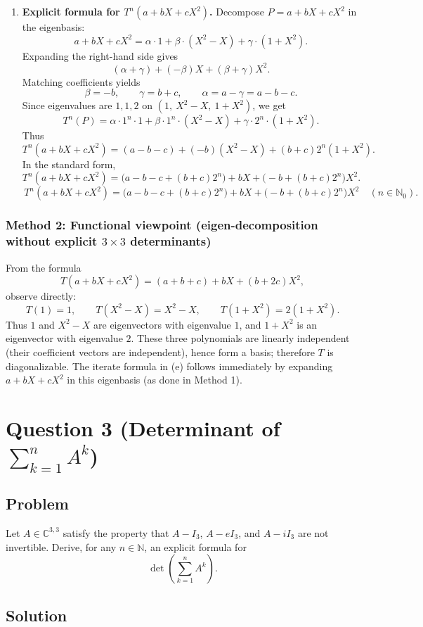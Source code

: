 \documentclass[12pt]{article}
\newcommand{\C}{\mathbb{C}}
\begin{document}
\begin{enumerate}[label=(\alph*)]
\item \textbf{Explicit formula for $T^n(a+bX+cX^2)$.}
Decompose $P=a+bX+cX^2$ in the eigenbasis:
\[
a+bX+cX^2 = \alpha\cdot 1 + \beta\cdot (X^2-X) + \gamma\cdot(1+X^2).
\]
Expanding the right-hand side gives
\[
(\alpha+\gamma) + (-\beta)X + (\beta+\gamma)X^2.
\]
Matching coefficients yields
\[
\beta=-b,\qquad \gamma=b+c,\qquad \alpha=a-\gamma=a-b-c.
\]
Since eigenvalues are $1,1,2$ on $(1,\ X^2-X,\ 1+X^2)$, we get
\[
T^n(P)=\alpha\cdot 1^n\cdot 1+\beta\cdot 1^n\cdot (X^2-X)+\gamma\cdot 2^n\cdot (1+X^2).
\]
Thus
\[
T^n(a+bX+cX^2)
=
(a-b-c) + (-b)(X^2-X) + (b+c)2^n(1+X^2).
\]
In the standard form,
\[
T^n(a+bX+cX^2)
=
\bigl(a-b-c+(b+c)2^n\bigr)
+bX
+\bigl(-b+(b+c)2^n\bigr)X^2.
\]
\[
\boxed{
\,
T^n(a+bX+cX^2)
=
\bigl(a-b-c+(b+c)2^n\bigr)
+bX
+\bigl(-b+(b+c)2^n\bigr)X^2
\quad(n\in\mathbb{N}_0).
\,}
\]
\end{enumerate}

\subsubsection{Method 2: Functional viewpoint (eigen-decomposition without explicit $3\times 3$ determinants)}
From the formula
\[
T(a+bX+cX^2)=(a+b+c)+bX+(b+2c)X^2,
\]
observe directly:
\[
T(1)=1,\qquad T(X^2-X)=X^2-X,\qquad T(1+X^2)=2(1+X^2).
\]
Thus $1$ and $X^2-X$ are eigenvectors with eigenvalue $1$, and $1+X^2$ is an eigenvector with eigenvalue $2$.
These three polynomials are linearly independent (their coefficient vectors are independent), hence form a basis; therefore $T$ is diagonalizable.
The iterate formula in (e) follows immediately by expanding $a+bX+cX^2$ in this eigenbasis (as done in Method 1).

\newpage
\section{Question 3 (Determinant of $\sum_{k=1}^n A^k$)}
\subsection{Problem}
Let $A\in \C^{3,3}$ satisfy the property that $A-I_3$, $A-eI_3$, and $A-iI_3$ are not invertible.
Derive, for any $n\in\mathbb{N}$, an explicit formula for
\[
\det\!\left(\sum_{k=1}^{n}A^k\right).
\]

\subsection{Solution}
\end{document}
